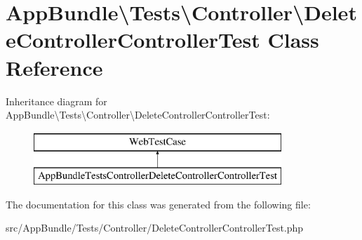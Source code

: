\hypertarget{class_app_bundle_1_1_tests_1_1_controller_1_1_delete_controller_controller_test}{}\section{App\+Bundle\textbackslash{}Tests\textbackslash{}Controller\textbackslash{}Delete\+Controller\+Controller\+Test Class Reference}
\label{class_app_bundle_1_1_tests_1_1_controller_1_1_delete_controller_controller_test}
Inheritance diagram for App\+Bundle\textbackslash{}Tests\textbackslash{}Controller\textbackslash{}Delete\+Controller\+Controller\+Test\+:\begin{figure}[H]
\begin{center}
\leavevmode
\includegraphics[height=2.000000cm]{class_app_bundle_1_1_tests_1_1_controller_1_1_delete_controller_controller_test}
\end{center}
\end{figure}


The documentation for this class was generated from the following file\+:\begin{DoxyCompactItemize}
\item 
src/\+App\+Bundle/\+Tests/\+Controller/Delete\+Controller\+Controller\+Test.\+php\end{DoxyCompactItemize}
